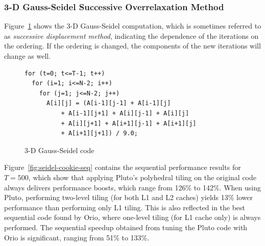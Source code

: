 
\subsubsection{3-D Gauss-Seidel Successive Overrelaxation Method}  
Figure~\ref{fig:seidel-code} shows the 3-D Gauss-Seidel computation, 
which is sometimes referred to as
\emph{successive displacement method}, indicating the dependence of the 
iterations on the ordering. If the ordering is changed, the components
of the new iterations will change as well.
%
\begin{figure}%
\begin{center}
\begin{minipage}{3in} 
\scriptsize
\begin{verbatim} 
for (t=0; t<=T-1; t++) 
  for (i=1; i<=N-2; i++) 
    for (j=1; j<=N-2; j++) 
      A[i][j] = (A[i-1][j-1] + A[i-1][j] 
          + A[i-1][j+1] + A[i][j-1] + A[i][j] 
          + A[i][j+1] + A[i+1][j-1] + A[i+1][j] 
          + A[i+1][j+1]) / 9.0; 
\end{verbatim} 
\end{minipage} 
\end{center}
\caption{3-D Gauss-Seidel code} 
\label{fig:seidel-code} 
\end{figure}
%


Figure~\ref{fig:seidel-cookie-seq} contains the sequential performance
results for $T=500$, which show that applying Pluto's polyhedral tiling on
the original code always delivers performance boosts, which range from 126\%
to 142\%. When using Pluto, performing two-level tiling (for both L1 and L2
caches) yields 13\% lower performance than performing only L1 tiling. 
This is also reflected in the best sequential code found by Orio, where
one-level tiling (for L1 cache only) is always performed. The sequential
speedup obtained from tuning the Pluto code with Orio is significant, ranging
from 51\% to 133\%.

